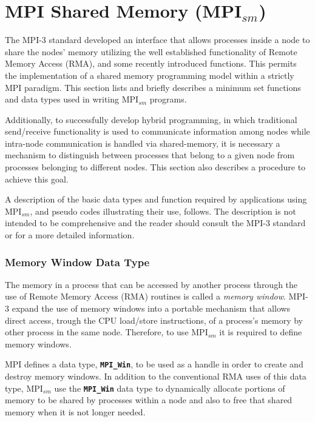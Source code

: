 \section{MPI Shared Memory (MPI$_{sm}$)} \label{MPISharedMemory}

The MPI-3 standard developed an interface that allows processes inside a node to share the nodes' memory utilizing the well established functionality of Remote Memory Access (RMA), and some recently introduced functions. This permits the implementation of a shared memory programming model within a strictly MPI paradigm. This section lists and briefly describes a minimum set functions and data types used in writing MPI$_{sm}$ programs. 
\medskip

Additionally, to successfully develop hybrid programming, in which traditional send/receive functionality is used to communicate information among nodes while intra-node communication is handled via shared-memory, it is necessary a mechanism to distinguish between processes that belong to a given node from processes belonging to different nodes. This section also describes a procedure to achieve this goal. 


\medskip

A description of the basic data types and function required by applications using MPI$_{sm}$, and pseudo codes illustrating their use, follows. The description is not intended to be comprehensive and the reader should consult the MPI-3 standard\cite{MPI-3}  or \cite{UsingAdvancedMPI} for a more detailed information.


\medskip

\subsubsection*{Memory Window Data Type}

The memory in a process that can be accessed by another process through the use of Remote Memory Access (RMA) routines is called a \emph{memory window}. MPI-3 expand the use of memory windows into a portable mechanism that allows direct access, trough the CPU load/store instructions, of a process's memory by other process in the same node. Therefore, to use MPI$_{sm}$ it is required to define memory windows.

\medskip

MPI defines a data type, \textbf{\texttt{MPI\_Win}}, to be used as a handle in order to create and destroy memory windows. In addition to the conventional RMA uses of this data type, MPI$_{sm}$ use the \textbf{\texttt{MPI\_Win}} data type to dynamically allocate portions of memory to be shared by processes within a node and also to free that shared memory when it is not longer needed.


